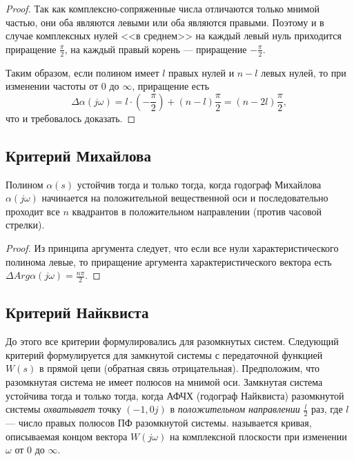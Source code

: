 \documentclass[../../TAU.tex]{subfiles}
\begin{document}
\begin{proof}
        Так как комплексно-сопряженные числа отличаются только мнимой частью, они оба являются левыми или оба являются правыми.
        Поэтому и в случае комплексных нулей <<в среднем>> на каждый левый нуль приходится приращение $\frac{\pi}{2}$, на каждый правый корень --- приращение {$-\frac{\pi}{2}$}.\par
        Таким образом, если полином имеет $l$ правых нулей и $n-l$ левых нулей, то при изменении частоты от $0$ до $\infty$, приращение есть
        $$
            \Delta \alpha(j \omega) = l\cdot(-\frac{\pi}{2})+(n-l)\frac{\pi}{2} = (n-2 l)\frac{\pi}{2},
        $$
        что и требовалось доказать.
    \end{proof}

\subsection{Критерий Михайлова}

    Полином $\alpha(s)$ устойчив тогда  и только тогда, когда годограф Михайлова $\alpha(j\omega)$ начинается на положительной вещественной оси и последовательно проходит все $n$ квадрантов в положительном направлении (против часовой стрелки).

    \begin{proof}
        Из принципа аргумента следует, что если все нули характеристического полинома левые, то приращение аргумента характеристического вектора есть $\Delta Arg \alpha(j \omega)=\frac{n \pi}{2}$.
    \end{proof}

\subsection{Критерий Найквиста}

    До этого все критерии формулировались для разомкнутых систем. Следующий критерий формулируется для замкнутой системы с передаточной функцией $W(s)$  в прямой цепи (обратная связь отрицательная).
    \theor[Найквист] Предположим, что разомкнутая система не имеет полюсов на мнимой оси.
    Замкнутая система устойчива тогда и только тогда, когда АФЧХ (годограф Найквиста) разомкнутой системы {\it охватывает} точку $(-1, 0j)$ в {\it положительном направлении} $\frac{l}{2}$ раз, где $l$ --- число правых полюсов ПФ разомкнутой системы.
     называется кривая, описываемая концом вектора $W(j\omega)$ на комплексной плоскости при изменении $\omega$ от $0$ до $\infty$.
\end{document}
